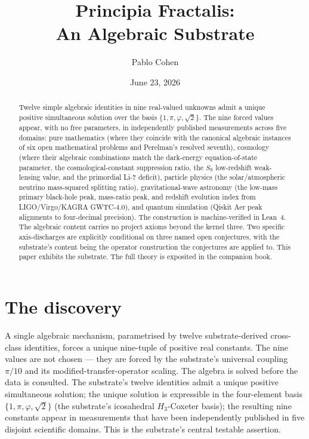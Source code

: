 \documentclass[11pt,a4paper]{amsart}
\title{Principia Fractalis:\\ An Algebraic Substrate}
\author{Pablo Cohen}
\date{June 23, 2026}
\theoremstyle{plain}
\theoremstyle{definition}
\begin{document}
\maketitle

\begin{abstract}
Twelve simple algebraic identities in nine real-valued unknowns admit a unique positive simultaneous solution over the basis $\{1,\pi,\varphi,\sqrt{2}\}$. The nine forced values appear, with no free parameters, in independently published measurements across five domains: pure mathematics (where they coincide with the canonical algebraic instances of six open mathematical problems and Perelman's resolved seventh), cosmology (where their algebraic combinations match the dark-energy equation-of-state parameter, the cosmological-constant suppression ratio, the $S_8$ low-redshift weak-lensing value, and the primordial Li-7 deficit), particle physics (the solar/atmospheric neutrino mass-squared splitting ratio), gravitational-wave astronomy (the low-mass primary black-hole peak, mass-ratio peak, and redshift evolution index from LIGO/Virgo/KAGRA GWTC-4.0), and quantum simulation (Qiskit Aer peak alignments to four-decimal precision). The construction is machine-verified in Lean~4. The algebraic content carries no project axioms beyond the kernel three. Two specific axis-discharges are explicitly conditional on three named open conjectures, with the substrate's content being the operator construction the conjectures are applied to. This paper exhibits the substrate. The full theory is exposited in the companion book.
\end{abstract}

\section{The discovery}

A single algebraic mechanism, parametrised by twelve substrate-derived cross-class identities, forces a unique nine-tuple of positive real constants. The nine values are not chosen --- they are forced by the substrate's universal coupling $\pi/10$ and its modified-transfer-operator scaling. The algebra is solved before the data is consulted. The substrate's twelve identities admit a unique positive simultaneous solution; the unique solution is expressible in the four-element basis $\{1,\pi,\varphi,\sqrt{2}\}$ (the substrate's icosahedral $H_3$-Coxeter basis); the resulting nine constants appear in measurements that have been independently published in five disjoint scientific domains. This is the substrate's central testable assertion.
\end{document}
